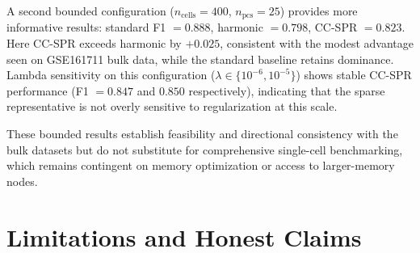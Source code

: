 \documentclass[11pt]{article}
\begin{document}
A second bounded configuration ($n_{\text{cells}} = 400$, $n_{\text{pcs}} = 25$) provides more informative results: standard F1 $= 0.888$, harmonic $= 0.798$, CC-SPR $= 0.823$.
Here CC-SPR exceeds harmonic by $+0.025$, consistent with the modest advantage seen on GSE161711 bulk data, while the standard baseline retains dominance.
Lambda sensitivity on this configuration ($\lambda \in \{10^{-6}, 10^{-5}\}$) shows stable CC-SPR performance (F1 $= 0.847$ and $0.850$ respectively), indicating that the sparse representative is not overly sensitive to regularization at this scale.

These bounded results establish feasibility and directional consistency with the bulk datasets but do not substitute for comprehensive single-cell benchmarking, which remains contingent on memory optimization or access to larger-memory nodes.

\section{Limitations and Honest Claims}
\label{sec:limitations}
\end{document}
